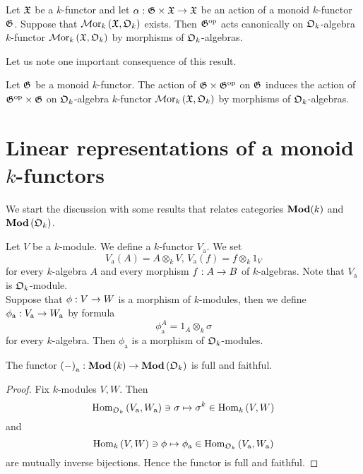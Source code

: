 \begin{proposition}\label{proposition:action_on_regular_k_functor}
Let ${\mathfrak X}$ be a $k$-functor and let $\alpha:{\mathfrak G}\times {\mathfrak X} \rightarrow {\mathfrak X}$ be an action of a monoid $k$-functor ${\mathfrak G}$. Suppose that $\mathcal{M}\mathrm{or}_k\left({\mathfrak X},{\mathfrak O}_k\right)$ exists. Then ${\mathfrak G}^{\mathrm{op}}$ acts canonically on ${\mathfrak O}_k$-algebra $k$-functor $\mathcal{M}\mathrm{or}_k\left({\mathfrak X},{\mathfrak O}_k\right)$ by morphisms of ${\mathfrak O}_k$-algebras.
\end{proposition}
\noindent
Let us note one important consequence of this result.

\begin{corollary}\label{corollary:action_on_regular_k_functor}
Let ${\mathfrak G}$ be a monoid $k$-functor. The action of ${\mathfrak G}\times {\mathfrak G}^{\mathrm{op}}$ on ${\mathfrak G}$ induces the action of ${\mathfrak G}^{\mathrm{op}}\times {\mathfrak G}$ on ${\mathfrak O}_k$-algebra $k$-functor $\mathcal{M}\mathrm{or}_k\left({\mathfrak X},{\mathfrak O}_k\right)$ by morphisms of ${\mathfrak O}_k$-algebras.
\end{corollary}

\section{Linear representations of a monoid $k$-functors}
\noindent
We start the discussion with some results that relates categories $\mathbf{Mod}(k)$ and $\mathbf{Mod}\left({\mathfrak O}_k\right)$.

\begin{example}\label{example:additive_k_functor}
Let $V$ be a $k$-module. We define a $k$-functor $V_{\mathrm{a}}$. We set
$$V_{\mathrm{a}}(A) = A\otimes_kV,\,V_{\mathrm{a}}(f) = f\otimes_k1_V$$
for every $k$-algebra $A$ and every morphism $f:A\rightarrow B$ of $k$-algebras. Note that $V_{\mathrm{a}}$ is ${\mathfrak O}_k$-module.\\
Suppose that $\phi:V\rightarrow W$ is a morphism of $k$-modules, then we define $\phi_{\mathrm{a}}:V_{\mathrm{a}}\rightarrow W_{\mathrm{a}}$ by formula
$$\phi_{\mathrm{a}}^A = 1_A\otimes_k\sigma$$
for every $k$-algebra. Then $\phi_{\mathrm{a}}$ is a morphism of ${\mathfrak O}_k$-modules.
\end{example}

\begin{proposition}\label{proposition:inclusion_of_k_modules_into_O_k_modules}
The functor $\left(-\right)_{\mathrm{a}}:\mathbf{Mod}\left(k\right)\rightarrow \mathbf{Mod}\left({\mathfrak O}_k\right)$ is full and faithful.
\end{proposition}
\begin{proof}
Fix $k$-modules $V,W$. Then
$$\mathrm{Hom}_{{\mathfrak O}_k}\left(V_{\mathrm{a}},W_{\mathrm{a}}\right)\ni \sigma \mapsto \sigma^k\in \mathrm{Hom}_k\left(V,W\right)$$
and
$$\mathrm{Hom}_k\left(V,W\right) \ni \phi \mapsto \phi_{\mathrm{a}} \in \mathrm{Hom}_{{\mathfrak O}_k}\left(V_{\mathrm{a}},W_{\mathrm{a}}\right)$$
are mutually inverse bijections. Hence the functor is full and faithful.
\end{proof}

